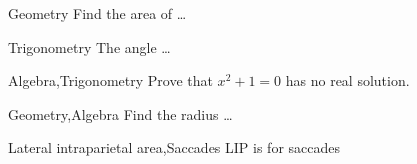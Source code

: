 \begin{pro}{Geometry}
Find the area of \ldots
\end{pro}

\begin{pro}{Trigonometry}
The angle \ldots
\end{pro}

\begin{pro}{Algebra,Trigonometry}
Prove that $x^2 + 1 = 0$ has no real solution.
\end{pro}

\begin{pro}{Geometry,Algebra}
Find the radius \ldots
\end{pro}

\begin{pro}{Lateral intraparietal area,Saccades}
LIP is for saccades
\end{pro}
